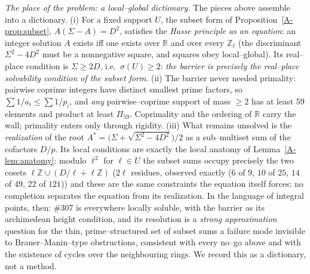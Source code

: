 \documentclass[11pt]{article}
\theoremstyle{definition}
\begin{document}
\emph{The place of the problem: a local--global dictionary.} The pieces above assemble into a dictionary. \textup{(i)} For a fixed support $U$, the subset form of
Proposition~\ref{A-prop:subset}, $A(\Sigma-A)=D^2$, satisfies the \emph{Hasse principle as an equation}:
an integer solution $A$ exists iff one exists over $\mathbb{R}$ and over every $\mathbb{Z}_\ell$ (the
discriminant $\Sigma^2-4D^2$ must be a nonnegative square, and squares obey local--global). Its
real--place condition is $\Sigma\ge2D$, i.e.\ $\sigma(U)\ge2$: \emph{the barrier is precisely the
real--place solvability condition of the subset form}. \textup{(ii)} The barrier never needed
primality: pairwise coprime integers have distinct smallest prime factors, so
$\sum 1/a_i\le\sum1/p_i$, and \emph{any} pairwise--coprime support of mass $\ge2$ has at least $59$
elements and product at least $\Pi_{59}$. Coprimality and the ordering of $\mathbb{R}$ carry the wall;
primality enters only through rigidity. \textup{(iii)} What remains unsolved is the \emph{realization}
of the root $A^*=\bigl(\Sigma+\sqrt{\Sigma^2-4D^2}\bigr)/2$ as a sub--multiset sum of the cofactors
$D/p$. Its local conditions are exactly the local anatomy of Lemma~\ref{A-lem:anatomy}: modulo $\ell^2$
for $\ell\in U$ the subset sums occupy precisely the two cosets
$\ell\mathbb{Z}\cup(D/\ell+\ell\mathbb{Z})$ ($2\ell$ residues, observed exactly ($6$ of $9$, $10$ of
$25$, $14$ of $49$, $22$ of $121$)) and these are the same constraints the equation itself forces:
no completion separates the equation from its realization. In the language of integral points, then:
\#307 is everywhere locally soluble, with the barrier as its archimedean height condition, and its
resolution is a \emph{strong approximation} question for the thin, prime--structured set of subset sums
a failure mode invisible to Brauer--Manin--type obstructions, consistent with every no--go above
and with the existence of cycles over the neighbouring rings. We record this as a dictionary, not a
method.
\end{document}
